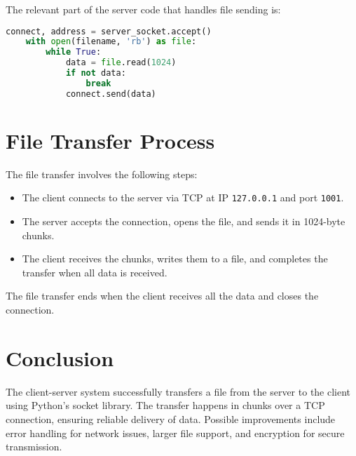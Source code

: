 \documentclass{article}
\begin{document}
The relevant part of the server code that handles file sending is:

\begin{lstlisting}[language=Python]
    connect, address = server_socket.accept()
    with open(filename, 'rb') as file:
        while True:
            data = file.read(1024)
            if not data:
                break  
            connect.send(data)
\end{lstlisting}

\section{File Transfer Process}
The file transfer involves the following steps:

\begin{itemize}
    \item The client connects to the server via TCP at IP \texttt{127.0.0.1} and port \texttt{1001}.
    \item The server accepts the connection, opens the file, and sends it in 1024-byte chunks.
    \item The client receives the chunks, writes them to a file, and completes the transfer when all data is received.
\end{itemize}

The file transfer ends when the client receives all the data and closes the connection.

\section{Conclusion}
The client-server system successfully transfers a file from the server to the client using Python’s socket library. The transfer happens in chunks over a TCP connection, ensuring reliable delivery of data. Possible improvements include error handling for network issues, larger file support, and encryption for secure transmission.
\end{document}
